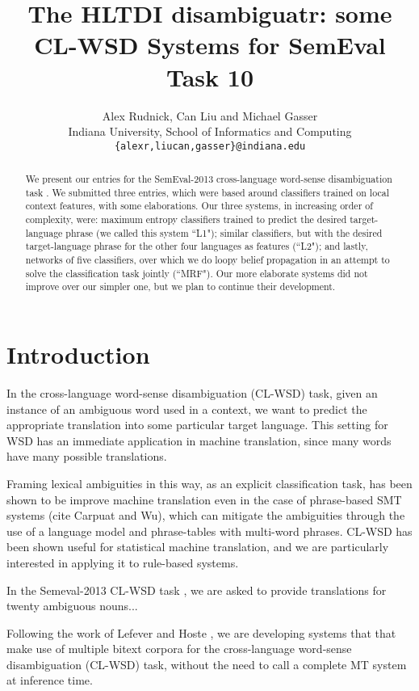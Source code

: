 \documentclass[11pt,letterpaper]{article}
\title{The HLTDI disambiguatr: some CL-WSD Systems for SemEval Task 10}
\author{Alex Rudnick, Can Liu and Michael Gasser\\
	    Indiana University, School of Informatics and Computing \\
	    {\tt \{alexr,liucan,gasser\}@indiana.edu}}
\date{}
\begin{document}
\maketitle

\begin{abstract}
We present our entries for the SemEval-2013 cross-language word-sense
disambiguation task \cite{task10}. We submitted three entries, which were based
around classifiers trained on local context features, with some elaborations.
Our three systems, in increasing order of complexity, were: maximum entropy
classifiers trained to predict the desired target-language phrase (we called
this system ``L1"); similar classifiers, but with the desired target-language
phrase for the other four languages as features (``L2"); and lastly, networks
of five classifiers, over which we do loopy belief propagation in an attempt to
solve the classification task jointly (``MRF"). Our more elaborate systems did
not improve over our simpler one, but we plan to continue their development.
\end{abstract}

\section{Introduction}
In the cross-language word-sense disambiguation (CL-WSD) task, given an
instance of an ambiguous word used in a context, we want to predict the
appropriate translation into some particular target language. This setting for
WSD has an immediate application in machine translation, since many words have
many possible translations.

Framing lexical ambiguities in this way, as an explicit classification task,
has been shown to be improve machine translation even in the case of
phrase-based SMT systems (cite Carpuat and Wu), which can mitigate the
ambiguities through the use of a language model and phrase-tables with
multi-word phrases.
CL-WSD has been shown useful for statistical machine translation, and we are
particularly interested in applying it to rule-based systems.

In the Semeval-2013 CL-WSD task \cite{task10}, we are asked to provide
translations for twenty ambiguous nouns...

Following the work of Lefever and Hoste
, we are developing systems
that that make use of multiple bitext corpora for the cross-language word-sense
disambiguation (CL-WSD) task, without the need to call a complete MT system at
inference time.
\end{document}
